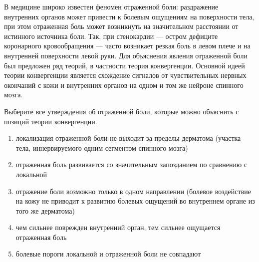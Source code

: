 
В
медицине широко известен феномен отраженной боли: раздражение внутренних
органов может привести к болевым ощущениям на поверхности тела, при этом
отраженная боль может возникнуть на значительном расстоянии от истинного
источника боли. Так, при стенокардии — остром дефиците коронарного кровообращения
— часто возникает резкая боль в левом плече и на внутренней поверхности левой
руки. Для объяснения явления отраженной боли был предложен ряд теорий, в
частности теория конвергенции. Основной идеей теории конвергенции является
схождение сигналов от чувствительных нервных окончаний с кожи и внутренних
органов на одном и том же нейроне спинного мозга.

Выберите все утверждения об отраженной боли,
которые можно объяснить с позиций теории конвергенции.

\begin{enumerate}
    \item локализация отраженной боли не выходит за пределы дерматома (участка тела, иннервируемого одним сегментом спинного мозга)
    \item отраженная боль развивается со значительным запозданием по сравнению с локальной
    \item отражение боли возможно только в одном направлении (болевое воздействие на кожу не приводит к развитию болевых ощущений во внутреннем органе из того же дерматома)
    \item чем сильнее поврежден внутренний орган, тем сильнее ощущается отраженная боль
    \item болевые пороги локальной и отраженной боли не совпадают
\end{enumerate}

\explanationSection

